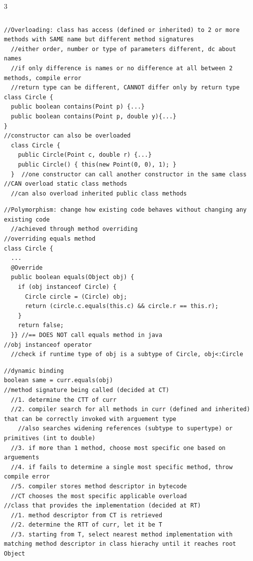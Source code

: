 \documentclass[10pt,a4paper]{article}
\begin{document}
\begin{multicols*}{3}
\begin{verbatim}
\end{verbatim}
\begin{verbatim}
//Overloading: class has access (defined or inherited) to 2 or more methods with SAME name but different method signatures
  //either order, number or type of parameters different, dc about names
  //if only difference is names or no difference at all between 2 methods, compile error
  //return type can be different, CANNOT differ only by return type
class Circle {
  public boolean contains(Point p) {...}
  public boolean contains(Point p, double y){...}
}
//constructor can also be overloaded
  class Circle {
    public Circle(Point c, double r) {...}
    public Circle() { this(new Point(0, 0), 1); }
  }  //one constructor can call another constructor in the same class
//CAN overload static class methods
  //can also overload inherited public class methods
\end{verbatim}
\begin{verbatim}
//Polymorphism: change how existing code behaves without changing any existing code
  //achieved through method overriding
//overriding equals method
class Circle {
  ...
  @Override
  public boolean equals(Object obj) {
    if (obj instanceof Circle) {
      Circle circle = (Circle) obj;
      return (circle.c.equals(this.c) && circle.r == this.r);
    }
    return false;
  }} //== DOES NOT call equals method in java
//obj instanceof operator
  //check if runtime type of obj is a subtype of Circle, obj<:Circle
\end{verbatim}
\begin{verbatim}
//dynamic binding
boolean same = curr.equals(obj)
//method signature being called (decided at CT)
  //1. determine the CTT of curr
  //2. compiler search for all methods in curr (defined and inherited) that can be correctly invoked with arguement type
    //also searches widening references (subtype to supertype) or primitives (int to double)
  //3. if more than 1 method, choose most specific one based on arguements
  //4. if fails to determine a single most specific method, throw compile error
  //5. compiler stores method descriptor in bytecode
  //CT chooses the most specific applicable overload
//class that provides the implementation (decided at RT)
  //1. method descriptor from CT is retrieved
  //2. determine the RTT of curr, let it be T
  //3. starting from T, select nearest method implementation with matching method descriptor in class hierachy until it reaches root Object

\end{verbatim}
\end{multicols*}
\end{document}

